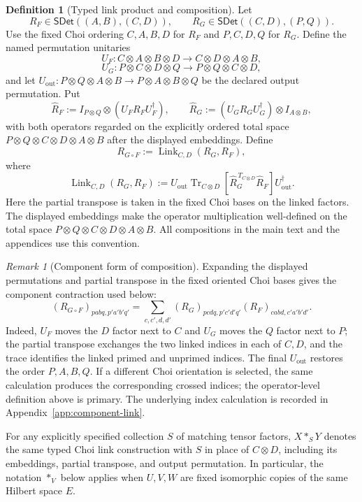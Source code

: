 \documentclass[11pt,a4paper]{article}
\theoremstyle{definition}
\newtheorem{definition}{Definition}[section]
\theoremstyle{plain}
\theoremstyle{remark}
\newtheorem{remark}[theorem]{Remark}
\newcommand{\SDet}{\mathsf{SDet}}
\begin{document}
\begin{definition}[Typed link product and composition]
\label{def:typed-link}
Let
\[
R_F\in\SDet((A,B),(C,D)),
\qquad
R_G\in\SDet((C,D),(P,Q)).
\]
Use the fixed Choi ordering $C,A,B,D$ for $R_F$ and
$P,C,D,Q$ for $R_G$. Define the named permutation unitaries
\[
U_F:C\otimes A\otimes B\otimes D\to C\otimes D\otimes A\otimes B,
\]
\[
U_G:P\otimes C\otimes D\otimes Q\to P\otimes Q\otimes C\otimes D,
\]
and let $U_{\mathrm{out}}:P\otimes Q\otimes A\otimes B\to
P\otimes A\otimes B\otimes Q$ be the declared output permutation. Put
\[
\widehat R_F:=I_{P\otimes Q}\otimes(U_FR_FU_F^\dagger),
\qquad
\widehat R_G:=(U_GR_GU_G^\dagger)\otimes I_{A\otimes B},
\]
with both operators regarded on the explicitly ordered total space
$P\otimes Q\otimes C\otimes D\otimes A\otimes B$ after the displayed
embeddings. Define
\[
R_{G\circ F}:=\operatorname{Link}_{C,D}(R_G,R_F),
\]
where
\[
\operatorname{Link}_{C,D}(R_G,R_F):=
U_{\mathrm{out}}\operatorname{Tr}_{C\otimes D}
\left[\widehat R_G^{\,T_{C\otimes D}}\widehat R_F\right]
U_{\mathrm{out}}^\dagger.
\]
Here the partial transpose is taken in the fixed Choi bases on the linked
factors. The displayed embeddings make the operator multiplication
well-defined on the total space $P\otimes Q\otimes C\otimes D\otimes A\otimes B$. All
compositions in the main text and the appendices use this convention.
\end{definition}

\begin{remark}[Component form of composition]
Expanding the displayed permutations and partial transpose in the fixed
oriented Choi bases gives the component contraction used below:
\[
(R_{G\circ F})_{pabq,p'a'b'q'}
=\sum_{c,c',d,d'}
(R_G)_{pcdq,p'c'd'q'}(R_F)_{cabd,c'a'b'd'}.
\]
Indeed, $U_F$ moves the $D$ factor next to $C$ and $U_G$ moves the $Q$
factor next to $P$; the partial transpose exchanges the two linked
indices in each of $C,D$, and the trace identifies the linked primed and
unprimed indices. The final $U_{\mathrm{out}}$ restores the order
$P,A,B,Q$. If a different Choi orientation is selected, the same
calculation produces the corresponding crossed indices; the operator-level
definition above is primary. The underlying index calculation is recorded
in Appendix~\ref{app:component-link}.
\end{remark}

For any explicitly specified collection $S$ of matching tensor factors,
$X*_S Y$ denotes the same typed Choi link construction with $S$ in place
of $C\otimes D$, including its embeddings, partial transpose, and output
permutation. In particular, the notation $*_V$ below applies when
$U,V,W$ are fixed isomorphic copies of the same Hilbert space $E$.
\end{document}

